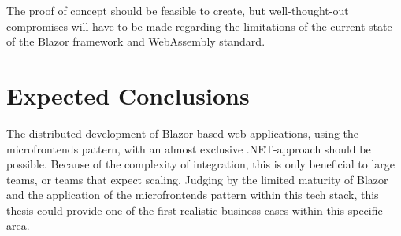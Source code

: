 The proof of concept should be feasible to create, but well-thought-out
compromises will have to be made regarding the limitations of the current state
of the Blazor framework and WebAssembly standard.




\section{Expected Conclusions}
\label{sec:expected-conclusions}

The distributed development of Blazor-based web applications, using the
microfrontends pattern, with an almost exclusive .NET-approach should be
possible. Because of the complexity of integration, this is only beneficial to
large teams, or teams that expect scaling. Judging by the limited maturity of
Blazor and the application of the microfrontends pattern within this tech
stack, this thesis could provide one of the first realistic business cases
within this specific area.